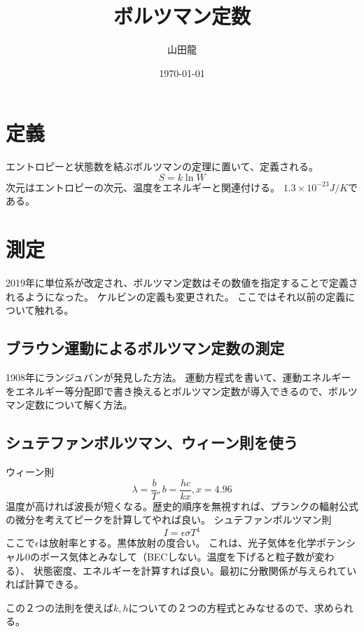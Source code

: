 \documentclass{jsarticle}
\date{\today}
\author{山田龍}
\title{ボルツマン定数}
\newcommand{\beq}{\begin{equation}}
\newcommand{\eeq}{\end{equation}}
\begin{document}
\maketitle
\section{定義}
エントロピーと状態数を結ぶボルツマンの定理に置いて、定義される。
\beq
    S = k \ln W
\eeq
次元はエントロピーの次元、温度をエネルギーと関連付ける。
$1.3 \times 10^{-23}J/K$である。

\section{測定}
2019年に単位系が改定され、ボルツマン定数はその数値を指定することで定義されるようになった。
ケルビンの定義も変更された\cite{undated-iq}。
ここではそれ以前の定義について触れる。
\subsection{ブラウン運動によるボルツマン定数の測定}
1908年にランジュバンが発見した方法。
運動方程式を書いて、運動エネルギーをエネルギー等分配即で書き換えるとボルツマン定数が導入できるので、ボルツマン定数について解く方法。
\subsection{シュテファンボルツマン、ウィーン則を使う}
ウィーン則
\beq
    \lambda = \frac{b}{T}, b = \frac{hc}{kx},x = 4.96
\eeq
温度が高ければ波長が短くなる。歴史的順序を無視すれば、プランクの輻射公式の微分を考えてピークを計算してやれば良い。
シュテファンボルツマン則
\beq
    I = \epsilon \sigma T^4
\eeq
ここで$\epsilon$は放射率とする。黒体放射の度合い。
これは、光子気体を化学ポテンシャル$0$のボース気体とみなして（BECしない。温度を下げると粒子数が変わる）、
状態密度、エネルギーを計算すれば良い。最初に分散関係が与えられていれば計算できる。

この２つの法則を使えば$k,h$についての２つの方程式とみなせるので、求められる。


\end{document}
